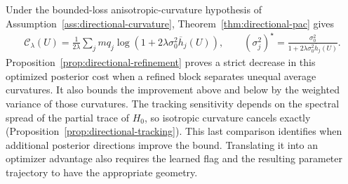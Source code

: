 Under the bounded-loss anisotropic-curvature hypothesis of
Assumption~\ref{ass:directional-curvature}, Theorem~\ref{thm:directional-pac} gives
\begin{gather}
 \mathcal C_\lambda(U)=\frac1{2\lambda}\sum_jmq_j
      \log(1+2\lambda\sigma_0^2\overline h_j(U)),\qquad
 (\sigma_j^2)^\star=\frac{\sigma_0^2}{1+2\lambda\sigma_0^2\overline h_j(U)}.
\end{gather}
Proposition~\ref{prop:directional-refinement} proves a strict decrease in this
optimized posterior cost when a refined block separates unequal average curvatures.
It also bounds the improvement above and below by the weighted variance of
those curvatures. The tracking sensitivity depends on the spectral spread of
the partial trace of $H_0$, so isotropic curvature cancels exactly
(Proposition~\ref{prop:directional-tracking}).
This last comparison identifies when additional posterior directions improve
the bound. Translating it into an optimizer advantage also requires the learned
flag and the resulting parameter trajectory to have the appropriate geometry.
